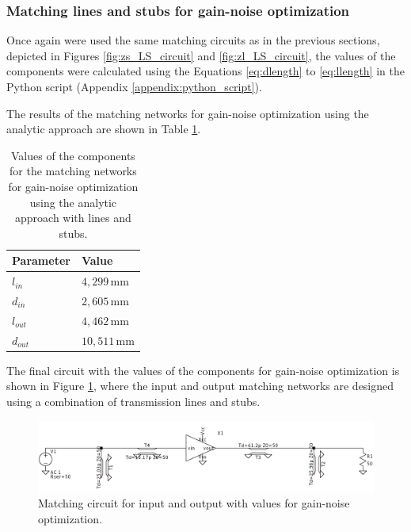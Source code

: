 \subsubsection{Matching lines and stubs for gain-noise optimization}

Once again were used the same matching circuits as in the previous sections, depicted in Figures \ref{fig:zs_LS_circuit} and \ref{fig:zl_LS_circuit}, the values of the components were calculated using the Equations \ref{eq:dlength} to \ref{eq:llength} in the Python script (Appendix \ref{appendix:python_script}).

The results of the matching networks for gain-noise optimization using the analytic approach are shown in Table \ref{tab:MatchingValuesLines-gain-noise}.

\begin{table}[H]
    \centering
    \caption{Values of the components for the matching networks for gain-noise optimization using the analytic approach with lines and stubs.}
    \begin{tabularx}{\textwidth}{>{\centering\arraybackslash}X >{\centering\arraybackslash}X}
        \toprule
        \textbf{Parameter} & \textbf{Value} \\
        \midrule
        $l_{in}$     & $4,299\,\si{\milli\meter}$ \\
        \midrule
        $d_{in}$   & $2,605\,\si{\milli\meter}$ \\
        \midrule
        $l_{out}$     & $4,462\,\si{\milli\meter}$\\
        \midrule
        $d_{out}$   & $10,511\,\si{\milli\meter}$\\
        \bottomrule
    \end{tabularx}
    \label{tab:MatchingValuesLines-gain-noise}
\end{table}

The final circuit with the values of the components for gain-noise optimization is shown in Figure \ref{fig:MatchingCircuit-line-gain-noise}, where the input and output matching networks are designed using a combination of transmission lines and stubs.

\begin{figure}[H]
    \centering
    \includegraphics[width=1\textwidth]{Images/LS-gain-noise-matching-circuit.png}
    \caption{Matching circuit for input and output with values for gain-noise optimization.}
    \label{fig:MatchingCircuit-line-gain-noise}
\end{figure}
